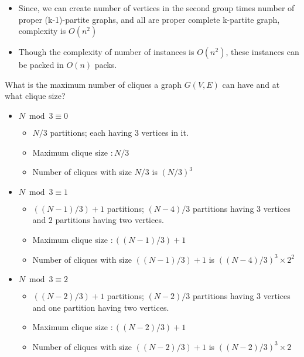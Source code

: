 \documentclass[landscape]{slides}
\begin{document}
\begin{slide}
\begin{itemize}
\begin{itemize}
\begin{itemize}
				\item the same k-1 partite graph can't be used more than once.
				\item Add the vertex from second group to form a trivial complete k-partite graph.
			\end{itemize}
			\item Since, we can create number of vertices in the second group times number of proper (k-1)-partite graphs, and all are proper complete k-partite graph, complexity is $O(n^2)$
			\item Though the complexity of number of instances is $O(n^2)$, these instances can be packed in $O(n)$ packs.
		\end{itemize}
	\end{itemize}
\end{slide}


\begin{slide}
	\begin{center}
		{\large What is the maximum number of cliques a graph $G(V,E)$ can have and at what clique size? }
	\end{center}
	\begin{itemize}
		\setlength{\itemsep}{0pt}
		\setlength{\parskip}{0pt}
		\setlength{\parsep}{0pt}
		\item $N \bmod 3 \equiv 0$
		\begin{itemize}
			\setlength{\itemsep}{0pt}
			\setlength{\parskip}{0pt}
			\setlength{\parsep}{0pt}
			\item $N/3$ partitions; each having $3$ vertices in it.
			\item Maximum clique size $ : N/3$
			\item Number of cliques with size $N/3$ is $(N/3)^3$
		\end{itemize}
		\item $N \bmod 3 \equiv 1$
		\begin{itemize}
			\setlength{\itemsep}{0pt}
			\setlength{\parskip}{0pt}
			\setlength{\parsep}{0pt}
			\item $((N-1)/3)+1$ partitions; $(N-4)/3$ partitions having $3$ vertices and $2$ partitions having two vertices.
			\item Maximum clique size $ : ((N-1)/3)+1$
			\item Number of cliques with size $((N-1)/3)+1$ is $((N-4)/3)^3 \times 2^2$
		\end{itemize}
		\item $N \bmod 3 \equiv 2$
		\begin{itemize}
			\setlength{\itemsep}{0pt}
			\setlength{\parskip}{0pt}
			\setlength{\parsep}{0pt}
			\item $((N-2)/3)+1$ partitions; $(N-2)/3$ partitions having $3$ vertices and one partition having two vertices.
			\item Maximum clique size $ : ((N-2)/3)+1$
			\item Number of cliques with size $((N-2)/3)+1$ is $((N-2)/3)^3 \times 2$
		\end{itemize}
	\end{itemize}
\end{slide}
\end{document}
